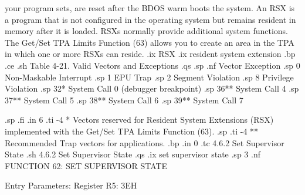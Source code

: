 your program sets, are reset after the BDOS warm boots the system. An RSX
is a program that is not configured in the operating system but remains
resident in memory after it is loaded. RSXs normally provide additional
system functions. The Get/Set TPA Limits Function (63) allows you to create
an area in the TPA in which one or more RSXs can reside. 
.ix RSX
.ix resident system extension
.bp
.ce
.sh
Table 4-21.  Valid Vectors and Exceptions
.qs
.sp 
.nf
                 Vector         Exception
.sp
		    0	     Non-Maskable Interrupt
.sp
		    1	     EPU Trap
.sp
                    2        Segment Violation
.sp
                    8        Privilege Violation
.sp
                   32*       System Call 0 (debugger breakpoint)
.sp
                   36**      System Call 4	
.sp
                   37**      System Call 5  
.sp
                   38**      System Call 6  
.sp
                   39**      System Call 7 
 
.sp        
.fi
.in 6
.ti -4
*   Vectors reserved for Resident System Extensions (RSX)
implemented with the Get/Set TPA Limits Function (63). 
.sp
.ti -4
**  Recommended Trap vectors for applications. 
.bp
.in 0
.tc         4.6.2  Set Supervisor State
.sh
4.6.2  Set Supervisor State
.qs
.ix set supervisor state
.sp 3
.nf
               FUNCTION 62:  SET SUPERVISOR STATE

                     Entry Parameters:  
                        Register   R5:  3EH

